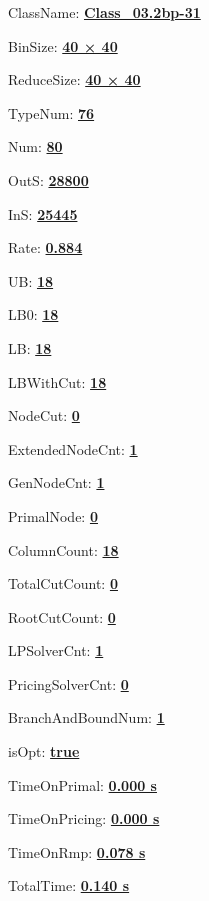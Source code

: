 \documentclass[11pt]{article}
\begin{document}
\pagestyle{empty}


ClassName: \underline{\textbf{Class_03.2bp-31}}
\par
BinSize: \underline{\textbf{40 × 40}}
\par
ReduceSize: \underline{\textbf{40 × 40}}
\par
TypeNum: \underline{\textbf{76}}
\par
Num: \underline{\textbf{80}}
\par
OutS: \underline{\textbf{28800}}
\par
InS: \underline{\textbf{25445}}
\par
Rate: \underline{\textbf{0.884}}
\par
UB: \underline{\textbf{18}}
\par
LB0: \underline{\textbf{18}}
\par
LB: \underline{\textbf{18}}
\par
LBWithCut: \underline{\textbf{18}}
\par
NodeCut: \underline{\textbf{0}}
\par
ExtendedNodeCnt: \underline{\textbf{1}}
\par
GenNodeCnt: \underline{\textbf{1}}
\par
PrimalNode: \underline{\textbf{0}}
\par
ColumnCount: \underline{\textbf{18}}
\par
TotalCutCount: \underline{\textbf{0}}
\par
RootCutCount: \underline{\textbf{0}}
\par
LPSolverCnt: \underline{\textbf{1}}
\par
PricingSolverCnt: \underline{\textbf{0}}
\par
BranchAndBoundNum: \underline{\textbf{1}}
\par
isOpt: \underline{\textbf{true}}
\par
TimeOnPrimal: \underline{\textbf{0.000 s}}
\par
TimeOnPricing: \underline{\textbf{0.000 s}}
\par
TimeOnRmp: \underline{\textbf{0.078 s}}
\par
TotalTime: \underline{\textbf{0.140 s}}
\par
\newpage


\end{document}
